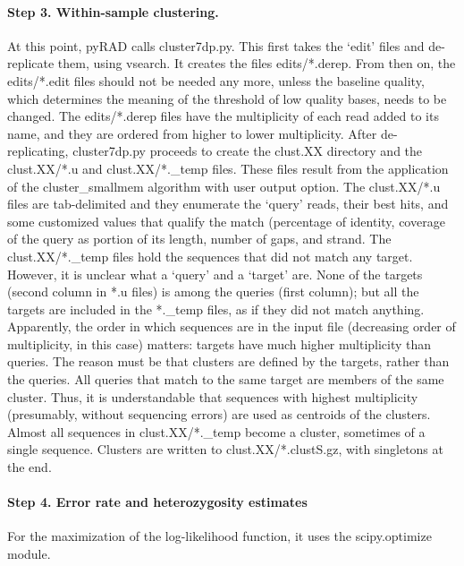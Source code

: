\documentclass[a4paper,12pt,twosided]{article}
\begin{document}
\paragraph{Step 3. Within-sample clustering.}
At this point, pyRAD calls cluster7dp.py. This first takes the `edit' files and de-replicate them, using vsearch. It creates the files edits/*.derep. From then on, the edits/*.edit files should not be needed any more, unless the baseline quality, which determines the meaning of the threshold of low quality bases, needs to be changed. The edits/*.derep files have the multiplicity of each read added to its name, and they are ordered from higher to lower multiplicity. After de-replicating, cluster7dp.py proceeds to create the clust.XX directory and the clust.XX/*.u and clust.XX/*.\_temp files. These files result from the application of the cluster\_smallmem algorithm with user output option. The clust.XX/*.u files are tab-delimited and they enumerate the `query' reads, their best hits, and some customized values that qualify the match (percentage of identity, coverage of the query as portion of its length, number of gaps, and strand. The clust.XX/*.\_temp files hold the sequences that did not match any target. However, it is unclear what a `query' and a `target' are. None of the targets (second column in *.u files) is among the queries (first column); but all the targets are included in the *.\_temp files, as if they did not match anything. Apparently, the order in which sequences are in the input file (decreasing order of multiplicity, in this case) matters: targets have much higher multiplicity than queries. The reason must be that clusters are defined by the targets, rather than the queries. All queries that match to the same target are members of the same cluster. Thus, it is understandable that sequences with highest multiplicity (presumably, without sequencing errors) are used as centroids of the clusters. Almost all sequences in clust.XX/*.\_temp become a cluster, sometimes of a single sequence. Clusters are written to clust.XX/*.clustS.gz, with singletons at the end.

\paragraph{Step 4. Error rate and heterozygosity estimates}
For the maximization of the log-likelihood function, it uses the scipy.optimize module.
\end{document}
